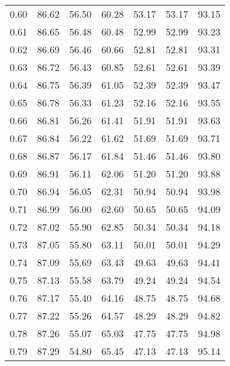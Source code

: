 \begin{tabular}{|c|c|c|c|c|c|c|}
      0.60 &     86.62 &     56.50 &      60.28 &   53.17 &      53.17 &         93.15 \\
      0.61 &     86.65 &     56.48 &      60.48 &   52.99 &      52.99 &         93.23 \\
      0.62 &     86.69 &     56.46 &      60.66 &   52.81 &      52.81 &         93.31 \\
      0.63 &     86.72 &     56.43 &      60.85 &   52.61 &      52.61 &         93.39 \\
      0.64 &     86.75 &     56.39 &      61.05 &   52.39 &      52.39 &         93.47 \\
      0.65 &     86.78 &     56.33 &      61.23 &   52.16 &      52.16 &         93.55 \\
      0.66 &     86.81 &     56.26 &      61.41 &   51.91 &      51.91 &         93.63 \\
      0.67 &     86.84 &     56.22 &      61.62 &   51.69 &      51.69 &         93.71 \\
      0.68 &     86.87 &     56.17 &      61.84 &   51.46 &      51.46 &         93.80 \\
      0.69 &     86.91 &     56.11 &      62.06 &   51.20 &      51.20 &         93.88 \\
      0.70 &     86.94 &     56.05 &      62.31 &   50.94 &      50.94 &         93.98 \\
      0.71 &     86.99 &     56.00 &      62.60 &   50.65 &      50.65 &         94.09 \\
      0.72 &     87.02 &     55.90 &      62.85 &   50.34 &      50.34 &         94.18 \\
      0.73 &     87.05 &     55.80 &      63.11 &   50.01 &      50.01 &         94.29 \\
      0.74 &     87.09 &     55.69 &      63.43 &   49.63 &      49.63 &         94.41 \\
      0.75 &     87.13 &     55.58 &      63.79 &   49.24 &      49.24 &         94.54 \\
      0.76 &     87.17 &     55.40 &      64.16 &   48.75 &      48.75 &         94.68 \\
      0.77 &     87.22 &     55.26 &      64.57 &   48.29 &      48.29 &         94.82 \\
      0.78 &     87.26 &     55.07 &      65.03 &   47.75 &      47.75 &         94.98 \\
      0.79 &     87.29 &     54.80 &      65.45 &   47.13 &      47.13 &         95.14 \\

\end{tabular}
